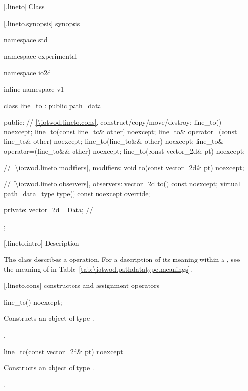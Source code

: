  [\iotwod.lineto] {Class }

 [\iotwod.lineto.synopsis] { synopsis}

\begin{codeblock}
namespace std { namespace experimental { namespace io2d { inline namespace v1 {
  class line_to : public path_data {
  public:
    // \ref{\iotwod.lineto.cons}, construct/copy/move/destroy:
    line_to() noexcept;
    line_to(const line_to& other) noexcept;
    line_to& operator=(const line_to& other) noexcept;
    line_to(line_to&& other) noexcept;
    line_to& operator=(line_to&& other) noexcept;
    line_to(const vector_2d& pt) noexcept;

    // \ref{\iotwod.lineto.modifiers}, modifiers:
    void to(const vector_2d& pt) noexcept;

    // \ref{\iotwod.lineto.observers}, observers:
    vector_2d to() const noexcept;
    virtual path_data_type type() const noexcept override;
    
  private:
    vector_2d _Data; // \expos
  };
} } } }
\end{codeblock}

 [\iotwod.lineto.intro] { Description}

\pnum
{}
The class  describes a  operation. For a description of its meaning within a , see the meaning of  in Table~\ref{tab:\iotwod.pathdatatype.meanings}.

 [\iotwod.lineto.cons] { constructors and assignment operators}

\begin{itemdecl}
    line_to() noexcept;
\end{itemdecl}
\begin{itemdescr}
	\pnum
	\effects
	Constructs an object of type .
	
	\pnum
	\postconditions
	.
\end{itemdescr}

\begin{itemdecl}
    line_to(const vector_2d& pt) noexcept;
\end{itemdecl}
\begin{itemdescr}
	\pnum
	\effects
	Constructs an object of type .
	
	\pnum
	\postconditions
	.
\end{itemdescr}

